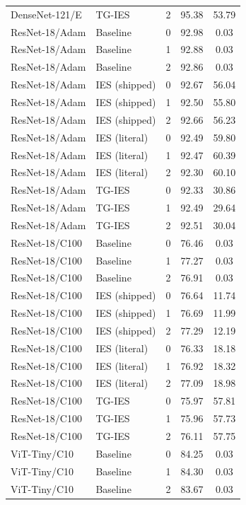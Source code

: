 \documentclass{article}
\newcommand{\win}[1]{\cellcolor{tgwin}#1}
\newcommand{\lose}[1]{\cellcolor{tglose}#1}
\theoremstyle{plain}
\theoremstyle{definition}
\theoremstyle{remark}
\begin{document}
\begin{longtable}{llccc}
DenseNet-121/E & TG-IES & 2 & \win{95.38} & \win{53.79} \\
ResNet-18/Adam & Baseline & 0 & 92.98 & 0.03 \\
ResNet-18/Adam & Baseline & 1 & 92.88 & 0.03 \\
ResNet-18/Adam & Baseline & 2 & 92.86 & 0.03 \\
ResNet-18/Adam & IES (shipped) & 0 & 92.67 & 56.04 \\
ResNet-18/Adam & IES (shipped) & 1 & 92.50 & 55.80 \\
ResNet-18/Adam & IES (shipped) & 2 & 92.66 & 56.23 \\
ResNet-18/Adam & IES (literal) & 0 & 92.49 & 59.80 \\
ResNet-18/Adam & IES (literal) & 1 & 92.47 & 60.39 \\
ResNet-18/Adam & IES (literal) & 2 & 92.30 & 60.10 \\
ResNet-18/Adam & TG-IES & 0 & \lose{92.33} & \lose{30.86} \\
ResNet-18/Adam & TG-IES & 1 & \lose{92.49} & \lose{29.64} \\
ResNet-18/Adam & TG-IES & 2 & \lose{92.51} & \lose{30.04} \\
ResNet-18/C100 & Baseline & 0 & 76.46 & 0.03 \\
ResNet-18/C100 & Baseline & 1 & 77.27 & 0.03 \\
ResNet-18/C100 & Baseline & 2 & 76.91 & 0.03 \\
ResNet-18/C100 & IES (shipped) & 0 & 76.64 & 11.74 \\
ResNet-18/C100 & IES (shipped) & 1 & 76.69 & 11.99 \\
ResNet-18/C100 & IES (shipped) & 2 & 77.29 & 12.19 \\
ResNet-18/C100 & IES (literal) & 0 & 76.33 & 18.18 \\
ResNet-18/C100 & IES (literal) & 1 & 76.92 & 18.32 \\
ResNet-18/C100 & IES (literal) & 2 & 77.09 & 18.98 \\
ResNet-18/C100 & TG-IES & 0 & \lose{75.97} & \win{57.81} \\
ResNet-18/C100 & TG-IES & 1 & \lose{75.96} & \win{57.73} \\
ResNet-18/C100 & TG-IES & 2 & \lose{76.11} & \win{57.75} \\
ViT-Tiny/C10 & Baseline & 0 & 84.25 & 0.03 \\
ViT-Tiny/C10 & Baseline & 1 & 84.30 & 0.03 \\
ViT-Tiny/C10 & Baseline & 2 & 83.67 & 0.03 \\

\end{longtable}
\end{document}
